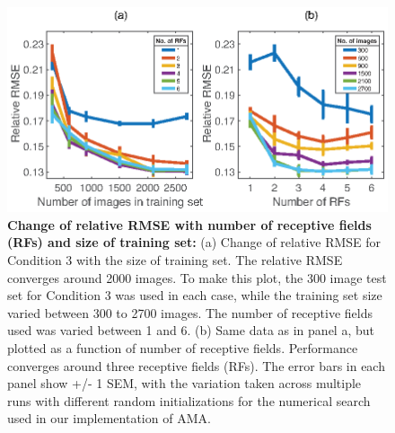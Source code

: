 \documentclass{jov}
\begin{document}
\begin{figure}
\centering
\includegraphics{Figure13.eps}
\caption{{\bf Change of relative RMSE with number of receptive fields (RFs) and size of training set:} (a) Change of relative RMSE for Condition 3 with the size of training set. The relative RMSE converges around 2000 images. To make this plot, the 300 image test set for Condition 3 was used in each case, while the training set size varied between 300 to 2700 images. The number of receptive fields used was varied between 1 and 6. (b) Same data as in panel a, but plotted as a function of number of receptive fields. Performance converges around three receptive fields (RFs). The error bars in each panel show +/- 1 SEM, with the variation taken across multiple runs with different random initializations for the numerical search used in our implementation of AMA.}
 \label{fig:RMSEvsRF}
\end{figure}
\end{document}
